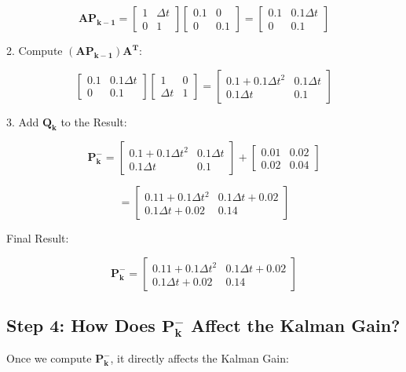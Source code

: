 \documentclass{article}
\begin{document}
\[
\mathbf{A P_{k-1}} =
\begin{bmatrix}
1 & \Delta t \\
0 & 1
\end{bmatrix}
\begin{bmatrix}
0.1 & 0 \\
0 & 0.1
\end{bmatrix}
=
\begin{bmatrix}
0.1 & 0.1 \Delta t \\
0 & 0.1
\end{bmatrix}
\]

2. Compute \((\mathbf{A P_{k-1}}) \mathbf{A^T}\):

\[
\begin{bmatrix}
0.1 & 0.1 \Delta t \\
0 & 0.1
\end{bmatrix}
\begin{bmatrix}
1 & 0 \\
\Delta t & 1
\end{bmatrix}
=
\begin{bmatrix}
0.1 + 0.1 \Delta t^2 & 0.1 \Delta t \\
0.1 \Delta t & 0.1
\end{bmatrix}
\]

3. Add \(\mathbf{Q_k}\) to the Result:

\[
\mathbf{P_k^-} =
\begin{bmatrix}
0.1 + 0.1 \Delta t^2 & 0.1 \Delta t \\
0.1 \Delta t & 0.1
\end{bmatrix}
+
\begin{bmatrix}
0.01 & 0.02 \\
0.02 & 0.04
\end{bmatrix}
\]

\[
=
\begin{bmatrix}
0.11 + 0.1 \Delta t^2 & 0.1 \Delta t + 0.02 \\
0.1 \Delta t + 0.02 & 0.14
\end{bmatrix}
\]

Final Result:

\[
\mathbf{P_k^-} =
\begin{bmatrix}
0.11 + 0.1 \Delta t^2 & 0.1 \Delta t + 0.02 \\
0.1 \Delta t + 0.02 & 0.14
\end{bmatrix}
\]

\subsection*{Step 4: How Does \(\mathbf{P_k^-}\) Affect the Kalman Gain?}
Once we compute \(\mathbf{P_k^-}\), it directly affects the Kalman Gain:
\end{document}
